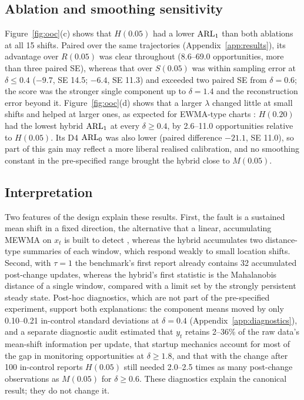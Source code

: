 \subsection{Ablation and smoothing sensitivity}

Figure~\ref{fig:ooc}(c) shows that $H(0.05)$ had a lower $\mathrm{ARL}_1$ than both ablations at all 15
shifts. Paired over the same trajectories (Appendix~\ref{app:results}), its advantage over $R(0.05)$
was clear throughout (8.6--69.0 opportunities, more than three paired SE), whereas that over
$S(0.05)$ was within sampling error at $\delta\le0.4$ ($-9.7$, SE 14.5; $-6.4$, SE 11.3) and exceeded
two paired SE from $\delta=0.6$; the score was the stronger single component up to $\delta=1.4$ and
the reconstruction error beyond it. Figure~\ref{fig:ooc}(d) shows that a larger $\lambda$ changed
little at small shifts and helped at larger ones, as expected for EWMA-type charts
\citep{lowry_multivariate_1992}: $H(0.20)$ had the lowest hybrid $\mathrm{ARL}_1$ at every $\delta\ge0.4$, by
2.6--11.0 opportunities relative to $H(0.05)$. Its D4 $\mathrm{ARL}_0$ was also lower (paired difference
$-21.1$, SE 11.0), so part of this gain may reflect a more liberal realised calibration, and no
smoothing constant in the pre-specified range brought the hybrid close to $M(0.05)$.

\subsection{Interpretation}

Two features of the design explain these results. First, the fault is a sustained mean shift in a
fixed direction, the alternative that a linear, accumulating MEWMA on $x_t$ is built to detect
\citep{lowry_multivariate_1992}, whereas the hybrid accumulates two distance-type summaries of each
window, which respond weakly to small location shifts. Second, with $\tau=1$ the benchmark's first
report already contains 32 accumulated post-change updates, whereas the hybrid's first statistic is
the Mahalanobis distance of a single window, compared with a limit set by the strongly persistent
steady state. Post-hoc diagnostics, which are not part of the pre-specified experiment, support both
explanations: the component means moved by only 0.10--0.21 in-control standard deviations at
$\delta=0.4$ (Appendix~\ref{app:diagnostics}), and a separate diagnostic audit estimated that $y_t$
retains 2--36\% of the raw data's mean-shift information per update, that startup mechanics account
for most of the gap in monitoring opportunities at $\delta\ge1.8$, and that with the change after
100 in-control reports $H(0.05)$ still needed 2.0--2.5 times as many post-change observations as
$M(0.05)$ for $\delta\ge0.6$. These diagnostics explain the canonical result; they do not change it.
